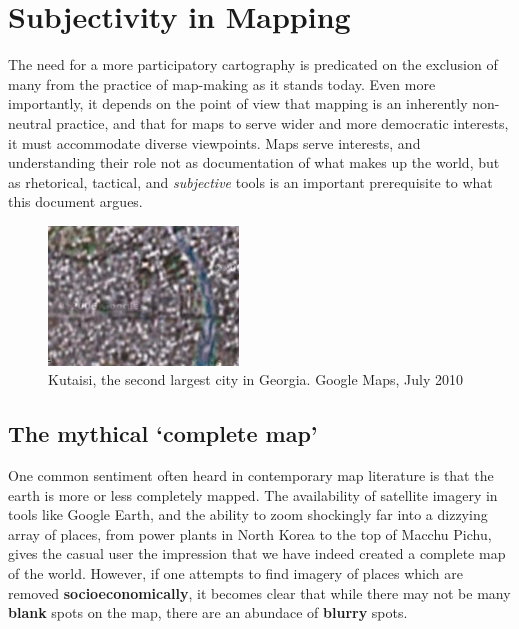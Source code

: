 \documentclass[11pt]{report}
\begin{document}
\chapter{Subjectivity in Mapping}
\label{chap:subjectivity}

The need for a more participatory cartography is predicated on the exclusion of many from the practice of map-making as it stands today. Even more importantly, it depends on the point of view that mapping is an inherently non-neutral practice, and that for maps to serve wider and more democratic interests, it must accommodate diverse viewpoints. Maps serve interests, and understanding their role not as documentation of what makes up the world, but as rhetorical, tactical, and \emph{subjective} tools is an important prerequisite to what this document argues.

\begin{figure}
	\begin{flushright}
		\includegraphics[width=0.45\textwidth]{images/kutaisi.png}
	\caption{Kutaisi, the second largest city in Georgia. Google Maps, July 2010}
	\end{flushright}
\end{figure}

\section{The mythical `complete map'}

One common sentiment often heard in contemporary map literature is that the earth is more or less completely mapped. The availability of satellite imagery in tools like Google Earth, and the ability to zoom shockingly far into a dizzying array of places, from power plants in North Korea to the top of Macchu Pichu, gives the casual user the impression that we have indeed created a complete map of the world. However, if one attempts to find imagery of places which are removed \textbf{socioeconomically}, it becomes clear that while there may not be many \textbf{blank} spots on the map, there are an abundace of \textbf{blurry} spots. 
\end{document}
